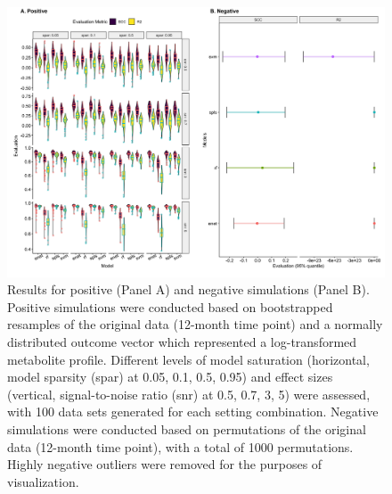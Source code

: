 \begin{figure}[!h]
    \centering
    \includegraphics[width=0.95\linewidth]{figures/appB_fs4.png}
    \caption[Results for positive (Panel A) and negative simulations (Panel B)]{Results for positive (Panel A) and negative simulations (Panel B). Positive simulations were conducted based on bootstrapped resamples of the original data (12-month time point) and a normally distributed outcome vector which represented a log-transformed metabolite profile. Different levels of model saturation (horizontal, model sparsity (spar) at 0.05, 0.1, 0.5, 0.95) and effect sizes (vertical, signal-to-noise ratio (snr) at 0.5, 0.7, 3, 5) were assessed, with 100 data sets generated for each setting combination. Negative simulations were conducted based on permutations of the original data (12-month time point), with a total of 1000 permutations. Highly negative outliers were removed for the purposes of visualization.}
    \label{fig:b4}
\end{figure}

